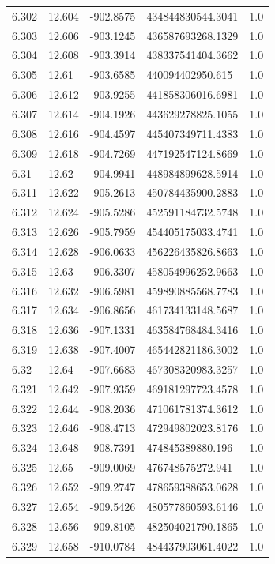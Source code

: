 \begin{tabular}{lllll}
6.302 & 12.604 & -902.8575 & 434844830544.3041 & 1.0 \\
6.303 & 12.606 & -903.1245 & 436587693268.1329 & 1.0 \\
6.304 & 12.608 & -903.3914 & 438337541404.3662 & 1.0 \\
6.305 & 12.61 & -903.6585 & 440094402950.615 & 1.0 \\
6.306 & 12.612 & -903.9255 & 441858306016.6981 & 1.0 \\
6.307 & 12.614 & -904.1926 & 443629278825.1055 & 1.0 \\
6.308 & 12.616 & -904.4597 & 445407349711.4383 & 1.0 \\
6.309 & 12.618 & -904.7269 & 447192547124.8669 & 1.0 \\
6.31 & 12.62 & -904.9941 & 448984899628.5914 & 1.0 \\
6.311 & 12.622 & -905.2613 & 450784435900.2883 & 1.0 \\
6.312 & 12.624 & -905.5286 & 452591184732.5748 & 1.0 \\
6.313 & 12.626 & -905.7959 & 454405175033.4741 & 1.0 \\
6.314 & 12.628 & -906.0633 & 456226435826.8663 & 1.0 \\
6.315 & 12.63 & -906.3307 & 458054996252.9663 & 1.0 \\
6.316 & 12.632 & -906.5981 & 459890885568.7783 & 1.0 \\
6.317 & 12.634 & -906.8656 & 461734133148.5687 & 1.0 \\
6.318 & 12.636 & -907.1331 & 463584768484.3416 & 1.0 \\
6.319 & 12.638 & -907.4007 & 465442821186.3002 & 1.0 \\
6.32 & 12.64 & -907.6683 & 467308320983.3257 & 1.0 \\
6.321 & 12.642 & -907.9359 & 469181297723.4578 & 1.0 \\
6.322 & 12.644 & -908.2036 & 471061781374.3612 & 1.0 \\
6.323 & 12.646 & -908.4713 & 472949802023.8176 & 1.0 \\
6.324 & 12.648 & -908.7391 & 474845389880.196 & 1.0 \\
6.325 & 12.65 & -909.0069 & 476748575272.941 & 1.0 \\
6.326 & 12.652 & -909.2747 & 478659388653.0628 & 1.0 \\
6.327 & 12.654 & -909.5426 & 480577860593.6146 & 1.0 \\
6.328 & 12.656 & -909.8105 & 482504021790.1865 & 1.0 \\
6.329 & 12.658 & -910.0784 & 484437903061.4022 & 1.0 \\

\end{tabular}
